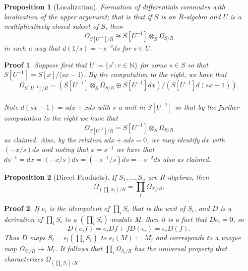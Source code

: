 \documentclass{beamer}
\newtheorem{prop}{Proposition}
\newtheorem{prf}{Proof}
\begin{document}
\begin{frame}
\begin{footnotesize}

\begin{prop}[Localization]
Formation of differentials commutes with localization of the upper argument; that is that if $S$ is an $R$-algebra and $U$ is a multiplicatively closed subset of $S$, then 
$$\Omega_{S[U^{-1}]/R}\cong S[U^{-1}]\otimes_S\Omega_{S/R}$$
in such a way that $d(1/s) = -s^{-2}ds$ for $s\in U$. 

\end{prop}

\begin{prf}
Suppose first that $U:=\{s^r:r\in\mathbb{N}\}$ for some $s\in S$ so that $S[U^{-1}] = S[x]/\langle sx-1\rangle$. By the computation to the right, we have that 
$$\Omega_{S[U^{-1}]/R} = (S[U^{-1}]\otimes_S\Omega_{S/R}\oplus S[U^{-1}]dx)/(S[U^{-1}]d(sx-1)).$$
\\Note $d(sx-1) = sdx + xds$ with $s$ a unit in $S[U^{-1}]$ so that by the further computation to the right we have that 
$$\Omega_{S[U^{-1}]/R} = S[U^{-1}]\otimes_S\Omega_{S/R}$$ 
as claimed. Also, by the relation $sdx+xds = 0$, we may identify $dx$ with $(-x/s)ds$ and noting that $x = s^{-1}$ we have that $ds^{-1} = dx = (-x/s)ds = (-{s^{-1}}/s)ds = -s^{-2}ds$ also as claimed. 




\end{prf}



\end{footnotesize}
\end{frame}

\begin{frame}
\begin{small}
\begin{prop}[Direct Products] If $S_1, ..., S_n$ are $R$-algebras, then 
$$\Omega_{(\prod_iS_i)/R} = \prod_i\Omega_{S_i/R}.$$
\end{prop}

\begin{prf}
If $e_i$ is the idempotent of $\prod_i S_i$ that is the unit of $S_i$, and $D$ is a derivation of $\prod_i S_i$ to a $(\prod_i S_i)$-module M, then it is a fact that $De_i = 0$, so 
$$D(e_if) = e_iDf + fD(e_i) = e_iD(f).$$
Thus $D$ maps $S_i = e_i(\prod_i S_i)$ to $e_i(M) := M_i$ and corresponds to a unique map $\Omega_{S_i/R}\to M_i$. It follows that $\prod_i\Omega_{S_i/R}$ has the universal property that characterizes $\Omega_{(\prod_iS_i)/R}$.

\end{prf}

\end{small}
\end{frame}
\end{document}
